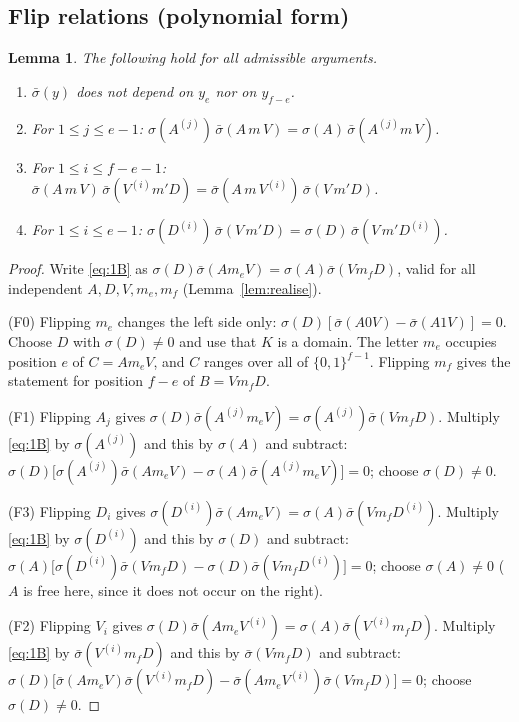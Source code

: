 \documentclass[11pt]{article}
\newtheorem{lemma}[theorem]{Lemma}
\theoremstyle{definition}
\theoremstyle{remark}
\begin{document}
\subsection{Flip relations (polynomial form)}

\begin{lemma}\label{lem:flip}
The following hold for all admissible arguments.
\begin{enumerate}
\item[\textup{(F0)}] $\bar\sigma(y)$ does not depend on $y_e$ nor on $y_{f-e}$.
\item[\textup{(F1)}] For $1\le j\le e-1$:\quad
   $\sigma(A^{(j)})\,\bar\sigma(A\,m\,V)=\sigma(A)\,\bar\sigma(A^{(j)}m\,V)$.
\item[\textup{(F2)}] For $1\le i\le f-e-1$:\quad
   $\bar\sigma(A\,m\,V)\,\bar\sigma(V^{(i)}m'D)=\bar\sigma(A\,m\,V^{(i)})\,\bar\sigma(V\,m'D)$.
\item[\textup{(F3)}] For $1\le i\le e-1$:\quad
   $\sigma(D^{(i)})\,\bar\sigma(V\,m'D)=\sigma(D)\,\bar\sigma(V\,m'D^{(i)})$.
\end{enumerate}
\end{lemma}

\begin{proof}
Write \eqref{eq:1B} as $\sigma(D)\bar\sigma(Am_eV)=\sigma(A)\bar\sigma(Vm_fD)$, valid for
all independent $A,D,V,m_e,m_f$ (Lemma~\ref{lem:realise}).

(F0) Flipping $m_e$ changes the left side only: $\sigma(D)[\bar\sigma(A0V)-\bar\sigma(A1V)]=0$.
Choose $D$ with $\sigma(D)\ne0$ and use that $K$ is a domain.  The letter $m_e$ occupies
position $e$ of $C=Am_eV$, and $C$ ranges over all of $\{0,1\}^{f-1}$.  Flipping $m_f$
gives the statement for position $f-e$ of $B=Vm_fD$.

(F1) Flipping $A_j$ gives $\sigma(D)\bar\sigma(A^{(j)}m_eV)=\sigma(A^{(j)})\bar\sigma(Vm_fD)$.
Multiply \eqref{eq:1B} by $\sigma(A^{(j)})$ and this by $\sigma(A)$ and subtract:
$\sigma(D)\bigl[\sigma(A^{(j)})\bar\sigma(Am_eV)-\sigma(A)\bar\sigma(A^{(j)}m_eV)\bigr]=0$;
choose $\sigma(D)\ne0$.

(F3) Flipping $D_i$ gives $\sigma(D^{(i)})\bar\sigma(Am_eV)=\sigma(A)\bar\sigma(Vm_fD^{(i)})$.
Multiply \eqref{eq:1B} by $\sigma(D^{(i)})$ and this by $\sigma(D)$ and subtract:
$\sigma(A)\bigl[\sigma(D^{(i)})\bar\sigma(Vm_fD)-\sigma(D)\bar\sigma(Vm_fD^{(i)})\bigr]=0$;
choose $\sigma(A)\ne0$ ($A$ is free here, since it does not occur on the right).

(F2) Flipping $V_i$ gives $\sigma(D)\bar\sigma(Am_eV^{(i)})=\sigma(A)\bar\sigma(V^{(i)}m_fD)$.
Multiply \eqref{eq:1B} by $\bar\sigma(V^{(i)}m_fD)$ and this by $\bar\sigma(Vm_fD)$ and
subtract: $\sigma(D)\bigl[\bar\sigma(Am_eV)\bar\sigma(V^{(i)}m_fD)
-\bar\sigma(Am_eV^{(i)})\bar\sigma(Vm_fD)\bigr]=0$; choose $\sigma(D)\ne0$.
\end{proof}
\end{document}
